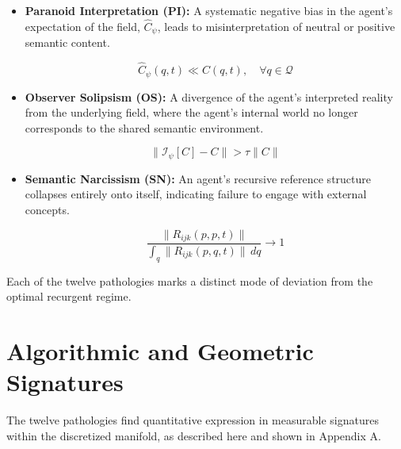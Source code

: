 \begin{itemize}

    \item \textbf{Paranoid Interpretation (PI):} A systematic negative bias in the agent's expectation of the field, \(\hat{C}_{\psi}\), leads to misinterpretation of neutral or positive semantic content.
    
    \begin{equation}
    \hat{C}_{\psi}(q,t) \ll C(q,t), \quad \forall q \in \mathcal{Q}
    \end{equation}

    \item \textbf{Observer Solipsism (OS):} A divergence of the agent's interpreted reality from the underlying field, where the agent's internal world no longer corresponds to the shared semantic environment.
    
    \begin{equation}
    \|\mathcal{I}_{\psi}[C] - C\| > \tau \|C\|
    \end{equation}

    \item \textbf{Semantic Narcissism (SN):} An agent's recursive reference structure collapses entirely onto itself, indicating failure to engage with external concepts.
    
    \begin{equation}
    \frac{\|R_{ijk}(p,p,t)\|}{\int_q \|R_{ijk}(p,q,t)\| \, dq} \to 1
    \end{equation}

\end{itemize}

Each of the twelve pathologies marks a distinct mode of deviation from the optimal recurgent regime.


\section{Algorithmic and Geometric Signatures}
\label{16.2:algorithmic_and_geometric_signatures}

The twelve pathologies find quantitative expression in measurable signatures within the discretized manifold, as described here and shown in Appendix A.



